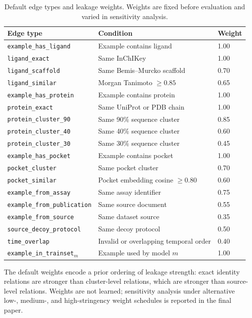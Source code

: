\documentclass[11pt]{article}
\begin{document}
\begin{table}[h]
\centering
\caption{Default edge types and leakage weights. Weights are fixed before evaluation and varied in sensitivity analysis.}
\label{tab:edges}
\begin{tabular}{lll}
\toprule
\textbf{Edge type} & \textbf{Condition} & \textbf{Weight} \\
\midrule
\texttt{example\_has\_ligand} & Example contains ligand & 1.00 \\
\texttt{ligand\_exact} & Same InChIKey & 1.00 \\
\texttt{ligand\_scaffold} & Same Bemis--Murcko scaffold & 0.70 \\
\texttt{ligand\_similar} & Morgan Tanimoto \(\geq 0.85\) & 0.65 \\
\texttt{example\_has\_protein} & Example contains protein & 1.00 \\
\texttt{protein\_exact} & Same UniProt or PDB chain & 1.00 \\
\texttt{protein\_cluster\_90} & Same 90\% sequence cluster & 0.85 \\
\texttt{protein\_cluster\_40} & Same 40\% sequence cluster & 0.60 \\
\texttt{protein\_cluster\_30} & Same 30\% sequence cluster & 0.45 \\
\texttt{example\_has\_pocket} & Example contains pocket & 1.00 \\
\texttt{pocket\_cluster} & Same pocket cluster & 0.70 \\
\texttt{pocket\_similar} & Pocket embedding cosine \(\geq 0.80\) & 0.60 \\
\texttt{example\_from\_assay} & Same assay identifier & 0.75 \\
\texttt{example\_from\_publication} & Same source document & 0.55 \\
\texttt{example\_from\_source} & Same dataset source & 0.35 \\
\texttt{source\_decoy\_protocol} & Same decoy protocol & 0.50 \\
\texttt{time\_overlap} & Invalid or overlapping temporal order & 0.40 \\
\texttt{example\_in\_trainset\(_m\)} & Example used by model \(m\) & 1.00 \\
\bottomrule
\end{tabular}
\end{table}

The default weights encode a prior ordering of leakage strength: exact identity relations are stronger than cluster-level relations, which are stronger than source-level relations. Weights are not learned; sensitivity analysis under alternative low-, medium-, and high-stringency weight schedules is reported in the final paper.
\end{document}
